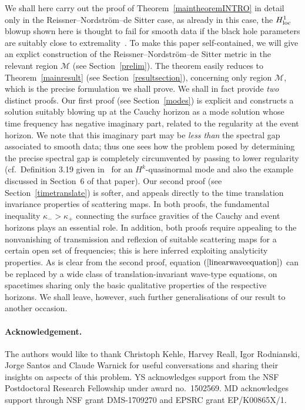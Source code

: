 \documentclass[A4,10pt]{article}
\begin{document}
We shall here carry out the proof of Theorem~\ref{maintheoremINTRO}
in detail only in the Reissner--Nordstr\"om--de Sitter case,
as already in this case, the $H^1_{\rm loc}$ blowup shown here is thought
to fail for smooth data if the black hole parameters are suitably
close to extremality~\cite{Dafermos2014, cardosoetal}. 
To make this paper self-contained, we will give  
an explict construction of  the  Reissner--Nordstr\"om--de Sitter 
metric in the relevant region $\mathcal{M}$ (see Section~\ref{prelim}).
The theorem  easily reduces to
Theorem~\ref{mainresult} (see Section~\ref{resultsection}), 
concerning only region $\mathcal{M}$, 
 which is the precise formulation we shall prove. 
We shall in fact
provide \emph{two} distinct proofs.
Our first proof (see Section~\ref{modes}) is explicit and constructs a solution suitably 
blowing up at the Cauchy horizon as a mode solution
whose time frequency has negative imaginary part,  related to the regularity
at the event horizon. We note that this imaginary part may be \emph{less than} the
spectral gap associated to smooth data; thus one sees how the problem posed
by determining the precise spectral gap is completely circumvented by passing to lower 
regularity (cf.~Definition 3.19 given in~\cite{warnick} for an $H^k$-quasinormal mode
and also the example discussed in Section~6 of that paper).
Our second proof (see Section~\ref{timetranslate})
is softer, and appeals directly to the time translation invariance properties of scattering
maps.
In both proofs, the fundamental inequality $\kappa_->\kappa_+$ connecting
the surface gravities of the Cauchy and event horizons plays an essential role.
In addition, both proofs require appealing to the nonvanishing of transmission and reflexion of
suitable scattering maps for a certain  open set  of frequencies; this is here inferred
exploiting analyticity properties.
As is clear from the second proof, 
equation $(\ref{linearwaveequation})$ can be replaced by 
a wide class of translation-invariant wave-type
equations, on spacetimes sharing only the basic qualitative properties of the 
respective horizons. 
We shall leave, however, such further generalisations of our result to another 
occasion.


\paragraph{Acknowledgement.} The authors would like to thank Christoph Kehle,
Harvey Reall, 
Igor Rodnianski, Jorge Santos and Claude Warnick for 
useful conversations and sharing their insights on aspects of this problem. 
YS acknowledges support from the NSF Postdoctoral Research Fellowship under award no.\ 1502569. MD acknowledges support through NSF grant DMS-1709270 and EPSRC grant EP/K00865X/1.
\end{document}
